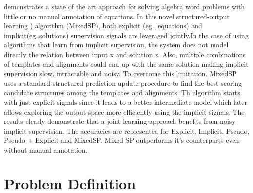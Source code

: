 \documentclass[11pt,letterpaper]{article}
\begin{document}
\cite{UpChChYi16} demonstrates a state of the art approach for solving algebra word problems with little or no manual annotation of equations. In this novel structured-output learning ) algorithm (MixedSP), both explicit (eg., equations) and implicit(eg.,solutions) supervision signals are leveraged jointly.In the case of using algorithms that learn from implicit supervision, the system does not model directly the relation between input x and solution z. Also, multiple combinations of templates and alignments could end up with the same solution making implicit supervision slow, intractable and noisy. To overcome this limitation, MixedSP uses a standard structured prediction update procedure to find the best scoring candidate structures among the templates and alignments. Th algorithm starts with just explicit signals since it leads to a better intermediate model which later allows exploring the output space more efficiently using the implicit signals. The results clearly demonstrate that a joint learning approach benefits from noisy implicit supervision. The accuracies are represented for Explicit, Implicit, Pseudo, Pseudo + Explicit and MixedSP. Mixed SP outperforms it's counterparts even without manual annotation.
\section{Problem Definition}
\end{document}
